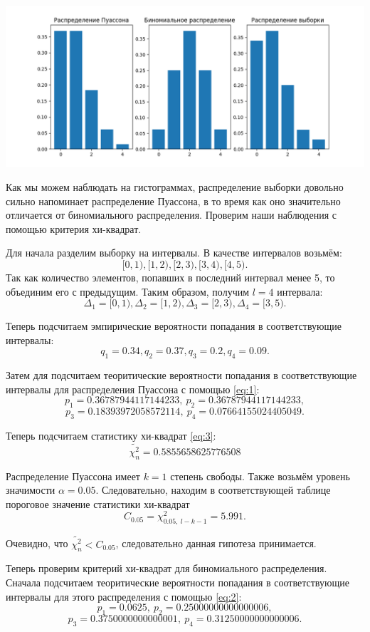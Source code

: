 \documentclass[12pt]{article}
\begin{document}
\includegraphics[scale=0.7]{hist}

Как мы можем наблюдать на гистограммах, распределение выборки довольно
сильно напоминает распределение Пуассона, в то время как оно значительно
отличается от биномиального распределения. Проверим наши наблюдения с помощью
критерия хи-квадрат.

Для начала разделим выборку на интервалы. В качестве интервалов возьмём:
$$[0, 1), [1, 2), [2, 3), [3, 4), [4, 5).$$ 
Так как количество элементов, попавших в 
последний интервал менее 5, то объединим его с предыдущим. 
Таким образом, получим
$l = 4$ интервала: $$\Delta_1 = [0, 1), \Delta_2 = [1, 2), \Delta_3 = [2, 3), \Delta_4 = [3, 5).$$

Теперь подсчитаем эмпирические вероятности попадания в соответствующие интервалы:
$$q_1 = 0.34, q_2 = 0.37, q_3 = 0.2, q_4 = 0.09.$$

Затем для подсчитаем теоритические вероятности 
попадания в соответствующие интервалы для распределения Пуассона
с помощью \eqref{eq:1}:
$$p_1 = 0.36787944117144233,\  p_2 = 0.36787944117144233,$$$$ p_3 = 0.18393972058572114, 
\  p_4 = 0.07664155024405049.$$

Теперь подсчитаем статистику хи-квадрат \eqref{eq:3}:
$$\widetilde{\chi^2_n} = 0.5855658625776508$$

Распределение Пуассона имеет $k = 1$ степень свободы. Также
возьмём уровень значимости $\alpha = 0.05$. Следовательно,
находим в соответствующей таблице пороговое значение статистики хи-квадрат
$$C_{0.05} = \chi^2_{0.05,\  l - k - 1} = 5.991.$$

Очевидно, что $\widetilde{\chi^2_n} < C_{0.05}$, следовательно данная гипотеза принимается.

Теперь проверим критерий хи-квадрат для биномиального распределения.
Сначала подсчитаем теоритические вероятности 
попадания в соответствующие интервалы для этого распределения
с помощью \eqref{eq:2}:
$$p_1 = 0.0625,\  p_2 = 0.25000000000000006,$$$$ p_3 = 0.3750000000000001, 
\  p_4 = 0.31250000000000006.$$
\end{document}
